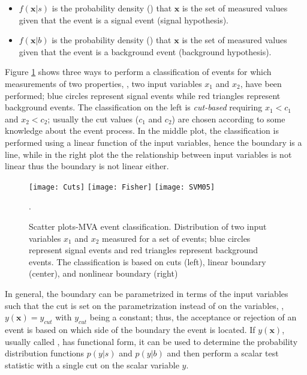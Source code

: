 \begin{itemize}
\item $f(\textbf{x}|s)$ is the probability density () that $\textbf{x}$ is the set of measured values given that the event is a signal event (signal hypothesis). 
\item $f(\textbf{x}|b)$ is the probability density () that $\textbf{x}$ is the set of measured values given that the event is a background event (background hypothesis).
\end{itemize}

Figure \ref{fig:scatter_plot} shows three ways to perform a classification of events for which measurements of two properties, \ie, two input variables $x_1$ and $x_2$, have been performed; blue circles represent signal events while red triangles represent background events. The classification on the left is \textit{cut-based} requiring $x_1<c_1$ and $x_2<c_2$; usually the cut values ($c_1$ and $c_2$) are chosen according to some knowledge about the event process. In the middle plot, the classification is performed using a linear function of the input variables, hence the boundary is a line, while in the right plot the the relationship between input variables is not linear thus the boundary is not linear either.          

\begin{figure}[!h]
  \centering
  \texttt{[image: Cuts]}
  \texttt{[image: Fisher]}
  \texttt{[image: SVM05]}
  \caption[Scatter plots-MVA event classification.]{Scatter plots-MVA event classification. Distribution of two input variables $x_1$ and $x_2$ measured for a set of events; blue circles represent signal events and red triangles represent background events. The classification is based on cuts (left), linear boundary (center), and nonlinear boundary (right)\cite{mva}}\label{fig:scatter_plot}.
\end{figure}

In general, the boundary can be parametrized in terms of the input variables such that the cut is set on the parametrization instead of on the variables, \ie, $y(\textbf{x})=y_{cut}$ with $y_{cut}$ being a constant; thus, the acceptance or rejection of an event is based on which side of the boundary the event is located. If $y(\textbf{x})$, usually called , has functional form, it can be used to determine the probability distribution functions $p(y|s)$ and $p(y|b)$ and then perform a scalar test statistic with a single cut on the scalar variable $y$. 

